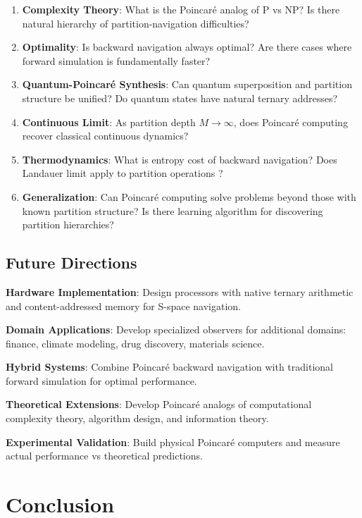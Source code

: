 \documentclass[twocolumn,10pt]{article}
\begin{document}
\begin{enumerate}
\item \textbf{Complexity Theory}: What is the Poincaré analog of P vs NP? Is there natural hierarchy of partition-navigation difficulties?

\item \textbf{Optimality}: Is backward navigation always optimal? Are there cases where forward simulation is fundamentally faster?

\item \textbf{Quantum-Poincaré Synthesis}: Can quantum superposition and partition structure be unified? Do quantum states have natural ternary addresses?

\item \textbf{Continuous Limit}: As partition depth $M \to \infty$, does Poincaré computing recover classical continuous dynamics?

\item \textbf{Thermodynamics}: What is entropy cost of backward navigation? Does Landauer limit apply to partition operations \cite{Landauer1961}?

\item \textbf{Generalization}: Can Poincaré computing solve problems beyond those with known partition structure? Is there learning algorithm for discovering partition hierarchies?
\end{enumerate}

\subsection{Future Directions}

\textbf{Hardware Implementation}: Design processors with native ternary arithmetic and content-addressed memory for S-space navigation.

\textbf{Domain Applications}: Develop specialized observers for additional domains: finance, climate modeling, drug discovery, materials science.

\textbf{Hybrid Systems}: Combine Poincaré backward navigation with traditional forward simulation for optimal performance.

\textbf{Theoretical Extensions}: Develop Poincaré analogs of computational complexity theory, algorithm design, and information theory.

\textbf{Experimental Validation}: Build physical Poincaré computers and measure actual performance vs theoretical predictions.

\section{Conclusion}
\end{document}
